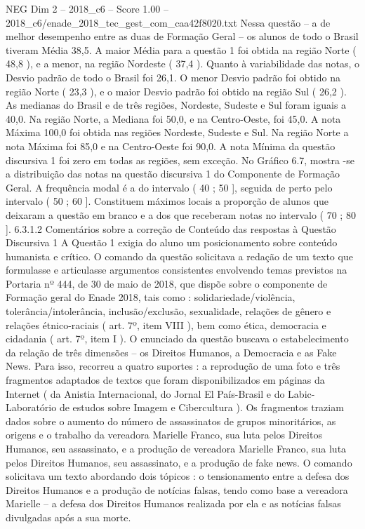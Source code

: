 \begin{textsample}{NEG Dim 2 – 2018\_c6 – Score 1.00 – 2018\_c6/enade\_2018\_tec\_gest\_com\_caa42f8020.txt}
Nessa questão – a de melhor desempenho entre as duas de Formação Geral – os alunos de todo o Brasil tiveram Média 38,5.
A maior Média para a questão 1 foi obtida na região Norte ( 48,8 ), e a menor, na região Nordeste ( 37,4 ).
Quanto à variabilidade das notas, o Desvio padrão de todo o Brasil foi 26,1.
O menor Desvio padrão foi obtido na região Norte ( 23,3 ), e o maior Desvio padrão foi obtido na região Sul ( 26,2 ).
As medianas do Brasil e de três regiões, Nordeste, Sudeste e Sul foram iguais a 40,0.
Na região Norte, a Mediana foi 50,0, e na Centro-Oeste, foi 45,0.
A nota Máxima 100,0 foi obtida nas regiões Nordeste, Sudeste e Sul.
Na região Norte a nota Máxima foi 85,0 e na Centro-Oeste foi 90,0.
A nota Mínima da questão discursiva 1 foi zero em todas as regiões, sem exceção.
No Gráfico 6.7, mostra -se a distribuição das notas na questão discursiva 1 do Componente de Formação Geral.
A frequência modal é a do intervalo ( 40 ; 50 ], seguida de perto pelo intervalo ( 50 ; 60 ].
Constituem máximos locais a proporção de alunos que deixaram a questão em branco e a dos que receberam notas no intervalo ( 70 ; 80 ]. 6.3.1.2 Comentários sobre a correção de Conteúdo das respostas à Questão Discursiva 1 A Questão 1 exigia do aluno um posicionamento sobre conteúdo humanista e crítico.
O comando da questão solicitava a redação de um texto que formulasse e articulasse argumentos consistentes envolvendo temas previstos na Portaria nº 444, de 30 de maio de 2018, que dispõe sobre o componente de Formação geral do Enade 2018, tais como : solidariedade/violência, tolerância/intolerância, inclusão/exclusão, sexualidade, relações de gênero e relações étnico-raciais ( art. 7º, item VIII ), bem como ética, democracia e cidadania ( art. 7º, item I ).
O enunciado da questão buscava o estabelecimento da relação de três dimensões – os Direitos Humanos, a Democracia e as Fake News.
Para isso, recorreu a quatro suportes : a reprodução de uma foto e três fragmentos adaptados de textos que foram disponibilizados em páginas da Internet ( da Anistia Internacional, do Jornal El País-Brasil e do Labic-Laboratório de estudos sobre Imagem e Cibercultura ).
Os fragmentos traziam dados sobre o aumento do número de assassinatos de grupos minoritários, as origens e o trabalho da vereadora Marielle Franco, sua luta pelos Direitos Humanos, seu assassinato, e a produção de vereadora Marielle Franco, sua luta pelos Direitos Humanos, seu assassinato, e a produção de fake news.
O comando solicitava um texto abordando dois tópicos : o tensionamento entre a defesa dos Direitos Humanos e a produção de notícias falsas, tendo como base a vereadora Marielle – a defesa dos Direitos Humanos realizada por ela e as notícias falsas divulgadas após a sua morte.

\end{textsample}
